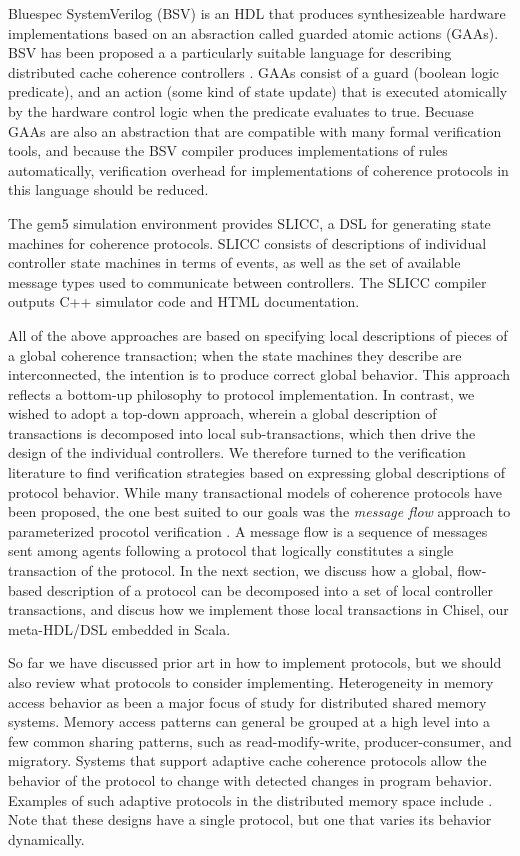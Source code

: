 Bluespec SystemVerilog (BSV) \cite{bluespec}
is an HDL that produces synthesizeable hardware implementations based on an absraction called guarded atomic actions (GAAs).
BSV has been proposed a a particularly suitable language for describing distributed cache coherence controllers \cite{dave-memocode05}.
GAAs consist of a guard (boolean logic predicate), and an action (some kind of state update)
that is executed atomically by the hardware control logic when the predicate evaluates to true.
Becuase GAAs are also an abstraction that are compatible with many formal verification tools,
and because the BSV compiler produces implementations of rules automatically,
verification overhead for implementations of coherence protocols in this language should be reduced.

The gem5 simulation environment \cite{binkert-sigarch11}
provides SLICC, a DSL for generating state machines for coherence protocols.
SLICC consists of descriptions of individual controller state machines in terms of events, as well as the set of available message types
used to communicate between controllers.
The SLICC compiler outputs C++ simulator code and HTML documentation.

All of the above approaches are based on specifying local descriptions of pieces of a global coherence transaction;
when the state machines they describe are interconnected, the intention is to produce correct global behavior.
This approach reflects a bottom-up philosophy to protocol implementation.
In contrast, we wished to adopt a top-down approach, wherein a global description of transactions
is decomposed into local sub-transactions, which then drive the design of the individual controllers.
We therefore turned to the verification literature to find verification strategies based on expressing global descriptions of protocol behavior.
While many transactional models of coherence protocols have been proposed,
the one best suited to our goals was the \emph{message flow} approach to parameterized procotol verification
\cite{talupur2008going, oleary-fmcad09}.
A message flow is a sequence of messages sent among agents following a protocol that
logically constitutes a single transaction of the protocol. 
In the next section, we discuss how a global, flow-based description of a protocol can be decomposed into a set
of local controller transactions, and discus how we implement those local transactions in Chisel,
our meta-HDL/DSL embedded in Scala.

So far we have discussed prior art in how to implement protocols,
but we should also review what protocols to consider implementing.
Heterogeneity in memory access behavior as been a major focus of study for distributed shared memory systems.
Memory access patterns can general be grouped at a high level into a few common sharing patterns, such as read-modify-write, producer-consumer, and migratory. Systems that support adaptive cache coherence protocols allow the behavior of the protocol to change with detected changes in program behavior.  Examples of such adaptive protocols in the distributed memory space include \cite{amza-hpca97,lebeck-archnews95,stenstrom-isca93,cox-isca93}. Note that these designs have a single protocol, but one that varies its behavior dynamically.

